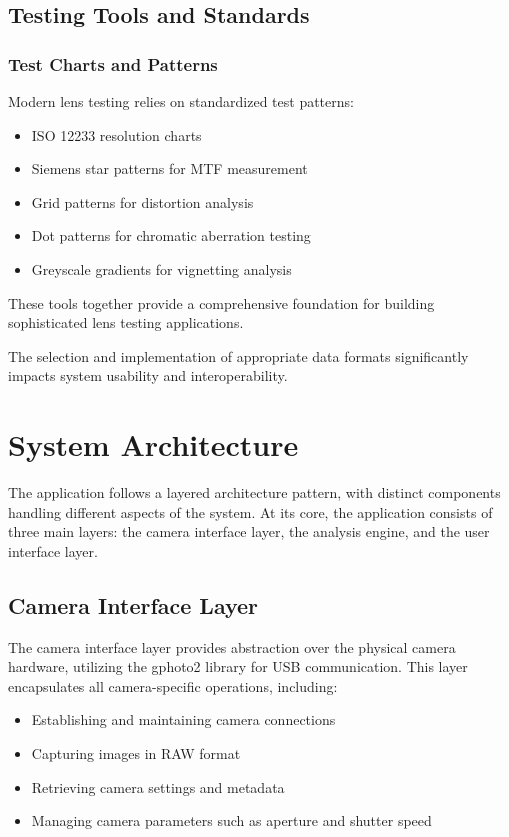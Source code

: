 \subsection{Testing Tools and Standards}
\subsubsection{Test Charts and Patterns}
Modern lens testing relies on standardized test patterns:
\begin{itemize}
    \item ISO 12233 resolution charts
    \item Siemens star patterns for MTF measurement
    \item Grid patterns for distortion analysis
    \item Dot patterns for chromatic aberration testing
    \item Greyscale gradients for vignetting analysis
\end{itemize}

These tools together provide a comprehensive foundation for building sophisticated lens testing applications.


The selection and implementation of appropriate data formats significantly impacts system usability and interoperability.


\section{System Architecture}

The application follows a layered architecture pattern, with distinct components handling different aspects of the system. At its core, the application consists of three main layers: the camera interface layer, the analysis engine, and the user interface layer.

\subsection{Camera Interface Layer}

The camera interface layer provides abstraction over the physical camera hardware, utilizing the gphoto2 library for USB communication. This layer encapsulates all camera-specific operations, including:

\begin{itemize}
    \item Establishing and maintaining camera connections
    \item Capturing images in RAW format
    \item Retrieving camera settings and metadata
    \item Managing camera parameters such as aperture and shutter speed
\end{itemize}



